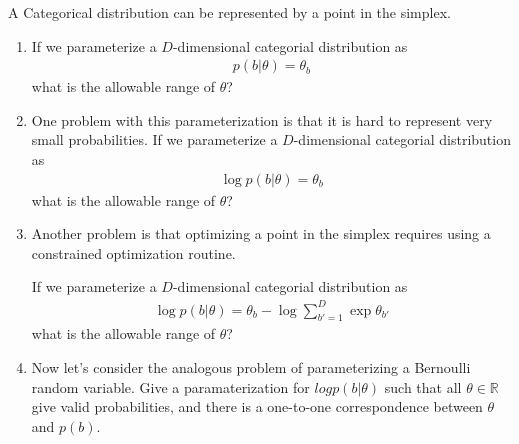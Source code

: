 \documentclass{harvardml}
\theoremstyle{plain}
\begin{document}
\begin{problem}

A Categorical distribution can be represented by a point in the simplex.

\begin{enumerate}[label=(\alph*)]
\item If we parameterize a $D$-dimensional categorial distribution as
%
\begin{align}
p(b | \theta) = \theta_b
\end{align}
%
what is the allowable range of $\theta$?

\item One problem with this parameterization is that it is hard to represent very small probabilities.  If we parameterize a $D$-dimensional categorial distribution as
%
\begin{align}
\log p(b | \theta) = \theta_b
\end{align}
%
what is the allowable range of $\theta$?

\item Another problem is that optimizing a point in the simplex requires using a constrained optimization routine.

If we parameterize a $D$-dimensional categorial distribution as
%
\begin{align}
\log p(b | \theta) = \theta_b - \log \sum_{b' = 1}^D \exp \theta_{b'}
\end{align}
%
what is the allowable range of $\theta$?

\item Now let's consider the analogous problem of parameterizing a Bernoulli random variable.
Give a paramaterization for $log p(b | \theta)$ such that all $\theta \in \mathbb{R}$ give valid probabilities, and there is a one-to-one correspondence between $\theta$ and $p(b)$.
\end{enumerate}

\end{problem}




\end{document}
